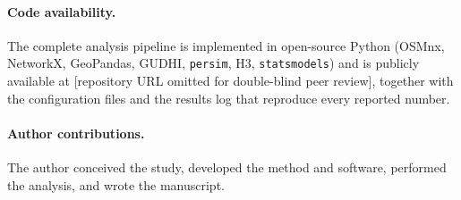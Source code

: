 \documentclass[sn-mathphys-num,pdflatex]{sn-jnl}
\begin{document}
\paragraph{Code availability.} The complete analysis pipeline is implemented in
open-source Python (OSMnx, NetworkX, GeoPandas, GUDHI, \texttt{persim}, H3,
\texttt{statsmodels}) and is publicly available at
[repository URL omitted for double-blind peer review], together with the
configuration files and the results log that reproduce every reported number.

\paragraph{Author contributions.} The author conceived
the study, developed the method and software, performed the analysis, and wrote
the manuscript.


\end{document}
